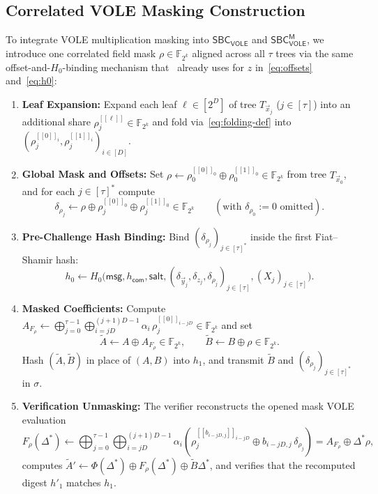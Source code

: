 \documentclass[11pt,a4paper]{article}
\theoremstyle{definition}
\theoremstyle{remark}
\newcommand{\Ftwok}{\mathbb{F}_{2^k}}
\newcommand{\SBCVOLE}{\mathsf{SBC}_{\mathsf{VOLE}}}
\newcommand{\SBCVOLEM}{\mathsf{SBC}_{\mathsf{VOLE}}^{\mathsf{M}}}
\newcommand{\salt}{\mathsf{salt}}
\newcommand{\msg}{\mathsf{msg}}
\newcommand{\com}{\mathsf{com}}
\newcommand{\share}[1]{[\![#1]\!]}
\begin{document}
\subsection{Correlated VOLE Masking Construction}
To integrate VOLE multiplication masking into $\SBCVOLE$ and $\SBCVOLEM$, we introduce one correlated field mask $\rho \in \Ftwok$ aligned across all $\tau$ trees via the same offset-and-$H_0$-binding mechanism that~\cite{HJ25} already uses for $z$ in~\eqref{eq:offsets} and~\eqref{eq:h0}:
\begin{enumerate}[leftmargin=2em]
    \item \textbf{Leaf Expansion:} Expand each leaf $\ell \in [2^D]$ of tree $T_{\vec{x}_j}$ ($j \in [\tau]$) into an additional share $\rho_j^{\share{\ell}} \in \Ftwok$ and fold via~\eqref{eq:folding-def} into $(\rho_j^{\share{0}_i}, \rho_j^{\share{1}_i})_{i \in [D]}$.
    \item \textbf{Global Mask and Offsets:} Set $\rho \leftarrow \rho_0^{\share{0}_0} \oplus \rho_0^{\share{1}_0} \in \Ftwok$ from tree $T_{\vec{x}_0}$, and for each $j \in [\tau]^*$ compute
    \[
    \delta_{\rho_j} \leftarrow \rho \oplus \rho_j^{\share{0}_0} \oplus \rho_j^{\share{1}_0} \in \Ftwok \qquad (\text{with } \delta_{\rho_0} := 0 \text{ omitted}).
    \]
    \item \textbf{Pre-Challenge Hash Binding:} Bind $(\delta_{\rho_j})_{j \in [\tau]^*}$ inside the first Fiat--Shamir hash:
    \begin{equation}
    \label{eq:h0-repaired}
    h_0 \leftarrow H_0\Big(\msg, h_{\com}, \salt, (\delta_{\vec{y}_j}, \delta_{z_j}, \delta_{\rho_j})_{j \in [\tau]}, (X_j)_{j \in [\tau]}\Big).
    \end{equation}
    \item \textbf{Masked Coefficients:} Compute $A_{F_\rho} \leftarrow \bigoplus_{j=0}^{\tau-1} \bigoplus_{i=jD}^{(j+1)D-1} \alpha_i \, \rho_j^{\share{0}_{i - jD}} \in \Ftwok$ and set
    \begin{equation}
    \label{eq:tilde-AB}
    \tilde{A} \leftarrow A \oplus A_{F_\rho} \in \Ftwok, \qquad \tilde{B} \leftarrow B \oplus \rho \in \Ftwok.
    \end{equation}
    Hash $(\tilde{A}, \tilde{B})$ in place of $(A, B)$ into $h_1$, and transmit $\tilde{B}$ and $(\delta_{\rho_j})_{j \in [\tau]^*}$ in $\sigma$.
    \item \textbf{Verification Unmasking:} The verifier reconstructs the opened mask VOLE evaluation
    \begin{equation}
    \label{eq:W-ver}
    F_\rho(\Delta^*) \leftarrow \bigoplus_{j=0}^{\tau-1} \bigoplus_{i=jD}^{(j+1)D-1} \alpha_i \left(\rho_j^{\share{b_{i-jD,j}}_{i-jD}} \oplus b_{i-jD,j} \, \delta_{\rho_j}\right) = A_{F_\rho} \oplus \Delta^* \rho,
    \end{equation}
    computes $\tilde{A}' \leftarrow \Phi(\Delta^*) \oplus F_\rho(\Delta^*) \oplus \tilde{B}\Delta^*$, and verifies that the recomputed digest $h'_1$ matches $h_1$.
\end{enumerate}
\end{document}
